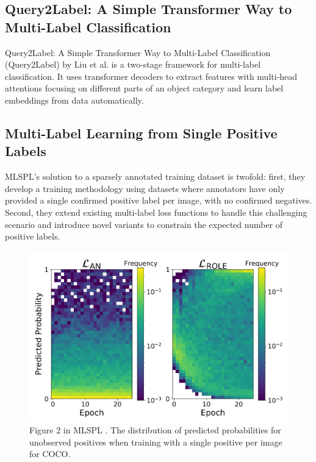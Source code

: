 \documentclass[lettersize,journal]{IEEEtran}
\begin{document}
\subsection{Query2Label: A Simple Transformer Way to Multi-Label Classification}
\label{sec:q2l_method}
Query2Label: A Simple Transformer Way to Multi-Label Classification (Query2Label) by Liu et al. \cite{Query2Label} is a two-stage framework for multi-label classification. It uses transformer decoders to extract features with multi-head attentions focusing on different parts of an object category and learn label embeddings from data automatically.

\subsection{Multi-Label Learning from Single Positive Labels}
MLSPL's solution to a sparsely annotated training dataset is twofold: first, they develop a training methodology using datasets where annotators have only provided a single confirmed positive label per image, with no confirmed negatives. Second, they extend existing multi-label loss functions to handle this challenging scenario and introduce novel variants to constrain the expected number of positive labels.

\begin{figure}[h]
    \centering
    \includegraphics[width=.8\linewidth]{images/mlsp_fig2.png}
    \caption{Figure 2 in MLSPL \cite{mlsp}. The distribution of predicted probabilities for unobserved positives when training with a single positive per image for COCO.}
    \label{fig:mlsp_fig2}
\end{figure}


\end{document}
